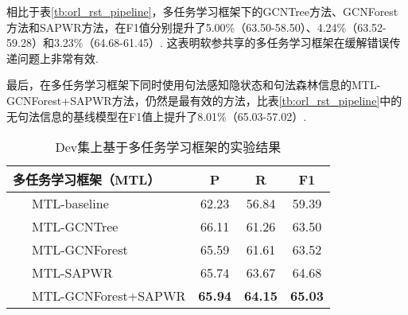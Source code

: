 相比于表\ref{tb:orl_rst_pipeline}，多任务学习框架下的GCNTree方法、GCNForest方法和SAPWR方法，在F1值分别提升了5.00\%（63.50-58.50）、4.24\%（63.52-59.28）和3.23\%（64.68-61.45）. 这表明软参共享的多任务学习框架在缓解错误传递问题上非常有效.

最后，在多任务学习框架下同时使用句法感知隐状态和句法森林信息的MTL-GCNForest+SAPWR方法，仍然是最有效的方法，比表\ref{tb:orl_rst_pipeline}中的无句法信息的基线模型在F1值上提升了8.01\%（65.03-57.02）.
\begin{table}[hb!]
    \caption{Dev集上基于多任务学习框架的实验结果}
    \label{tb:orl_rst_mtl}
    \centering
    \begin{tabular}{ l  c c c }
        \toprule
        \textbf{多任务学习框架（MTL）} & \textbf{P}     & \textbf{R}     & \textbf{F1}    \\ %
        \midrule %
        \ \ \ MTL-baseline             & 62.23          & 56.84          & 59.39          \\
        \midrule %
        \ \ \ MTL-GCNTree              & 66.11          & 61.26          & 63.50          \\  %
        \ \ \ MTL-GCNForest            & 65.59          & 61.61          & 63.52          \\  %
        \ \ \ MTL-SAPWR                & 65.74          & 63.67          & 64.68          \\
        \midrule %
        \ \ \ MTL-GCNForest+SAPWR      & \textbf{65.94} & \textbf{64.15} & \textbf{65.03} \\
        \bottomrule %
    \end{tabular}
\end{table}

